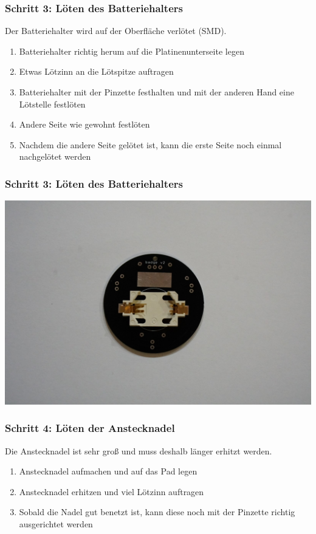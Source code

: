\documentclass[10pt]{beamer}
\begin{document}
	\begin{frame}
	\frametitle{Schritt 3: Löten des Batteriehalters}
	Der Batteriehalter wird auf der Oberfläche verlötet (SMD).
	\begin{enumerate} 
		\item{Batteriehalter richtig herum auf die Platinenunterseite legen}
		\item{Etwas Lötzinn an die Lötspitze auftragen}
		\item{Batteriehalter mit der Pinzette festhalten und mit der anderen Hand eine Lötstelle festlöten}
		\item{Andere Seite wie gewohnt festlöten}
		\item{Nachdem die andere Seite gelötet ist, kann die erste Seite noch einmal nachgelötet werden}
	\end{enumerate}
	\end{frame}

	\begin{frame}
		\frametitle{Schritt 3: Löten des Batteriehalters}
		\includegraphics[width=\linewidth]{images/badge18/battHolderInPlace.JPG}
	\end{frame}

	\begin{frame}
	\frametitle{Schritt 4: Löten der Anstecknadel}
	Die Anstecknadel ist sehr groß und muss deshalb länger erhitzt werden.
	\begin{enumerate} 
		\item{Anstecknadel aufmachen und auf das Pad legen}
		\item{Anstecknadel erhitzen und viel Lötzinn auftragen}
		\item{Sobald die Nadel gut benetzt ist, kann diese noch mit der Pinzette richtig ausgerichtet werden}
	\end{enumerate}
	\end{frame}
\end{document}
